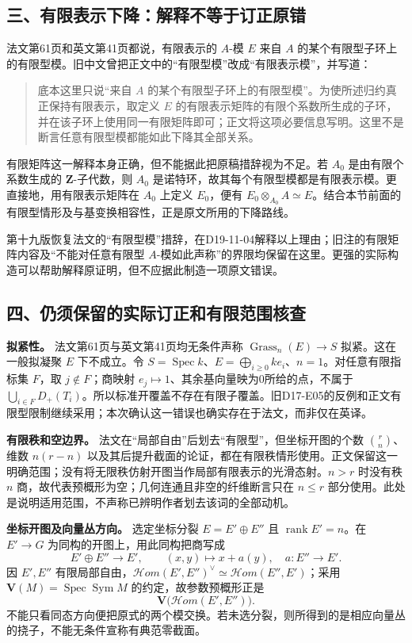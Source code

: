\documentclass[UTF8,a4paper]{ctexbook}
\DeclareMathOperator{\Spec}{Spec}
\begin{document}
\subsection*{三、有限表示下降：解释不等于订正原错}

法文第61页和英文第41页都说，有限表示的 $A$-模 $E$ 来自 $A$ 的某个有限型子环上的有限型模。旧中文曾把正文中的“有限型模”改成“有限表示模”，并写道：
\begin{quote}
底本这里只说“来自 $A$ 的某个有限型子环上的有限型模”。为使所述归约真正保持有限表示，取定义 $E$ 的有限表示矩阵的有限个系数所生成的子环，并在该子环上使用同一有限矩阵即可；正文将这项必要信息写明。这里不是断言任意有限型模都能如此下降其全部关系。
\end{quote}
有限矩阵这一解释本身正确，但不能据此把原稿措辞视为不足。若 $A_0$ 是由有限个系数生成的 $\mathbf Z$-子代数，则 $A_0$ 是诺特环，故其每个有限型模都是有限表示模。更直接地，用有限表示矩阵在 $A_0$ 上定义 $E_0$，便有 $E_0\otimes_{A_0}A\simeq E$。结合本节前面的有限型情形及与基变换相容性，正是原文所用的下降路线。

第十九版恢复法文的“有限型模”措辞，在D19-11-04解释以上理由；旧注的有限矩阵内容及“不能对任意有限型 $A$-模如此声称”的界限均保留在这里。更强的实际构造可以帮助解释原证明，但不应据此制造一项原文错误。

\subsection*{四、仍须保留的实际订正和有限范围核查}

\noindent\textbf{拟紧性。}
法文第61页与英文第41页均无条件声称 $\operatorname{Grass}_n(E)\to S$ 拟紧。这在一般拟凝聚 $E$ 下不成立。令 $S=\Spec k$、$E=\bigoplus_{i\geq0}ke_i$、$n=1$。对任意有限指标集 $F$，取 $j\notin F$；商映射 $e_j\mapsto1$、其余基向量映为0所给的点，不属于 $\bigcup_{i\in F}D_+(T_i)$。所以标准开覆盖不存在有限子覆盖。旧D17-E05的反例和正文有限型限制继续采用；本次确认这一错误也确实存在于法文，而非仅在英译。

\noindent\textbf{有限秩和空边界。}
法文在“局部自由”后划去“有限型”，但坐标开图的个数 $\binom rn$、维数 $n(r-n)$ 以及其后提升截面的论证，都在有限秩情形使用。正文保留这一明确范围；没有将无限秩仿射开图当作局部有限表示的光滑态射。$n>r$ 时没有秩 $n$ 商，故代表预概形为空；几何连通且非空的纤维断言只在 $n\leq r$ 部分使用。此处是说明适用范围，不声称已辨明作者划去该词的全部动机。

\noindent\textbf{坐标开图及向量丛方向。}
选定坐标分裂 $E=E'\oplus E''$ 且 $\operatorname{rank}E'=n$。在 $E'\to G$ 为同构的开图上，用此同构把商写成
\[
E'\oplus E''\longrightarrow E',\qquad (x,y)\longmapsto x+a(y),
\quad a:E''\longrightarrow E'.
\]
因 $E',E''$ 有限局部自由，$\mathscr Hom(E',E'')^\vee\simeq\mathscr Hom(E'',E')$；采用 $\mathbf V(M)=\Spec\operatorname{Sym}M$ 的约定，故参数预概形正是
\[
\mathbf V\bigl(\mathscr Hom(E',E'')\bigr).
\]
不能只看同态方向便把原式的两个模交换。若未选分裂，则所得到的是相应向量丛的挠子，不能无条件宣称有典范零截面。
\end{document}
